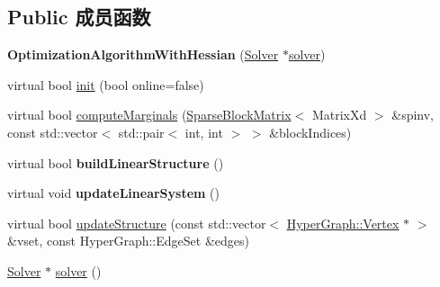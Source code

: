 \subsection*{Public 成员函数}
\begin{DoxyCompactItemize}
\item 
\hypertarget{classg2o_1_1OptimizationAlgorithmWithHessian_a1358f3500efe8b95a5af4a1b0edecdf0}{{\bfseries Optimization\-Algorithm\-With\-Hessian} (\hyperlink{classg2o_1_1Solver}{Solver} $\ast$\hyperlink{classg2o_1_1OptimizationAlgorithmWithHessian_a85473a4073c76b1a52cf9cf175e31c45}{solver})}\label{classg2o_1_1OptimizationAlgorithmWithHessian_a1358f3500efe8b95a5af4a1b0edecdf0}

\item 
virtual bool \hyperlink{classg2o_1_1OptimizationAlgorithmWithHessian_ae067a9c2961718dc8a37e3b8478b6d01}{init} (bool online=false)
\item 
virtual bool \hyperlink{classg2o_1_1OptimizationAlgorithmWithHessian_af1959727df2b7cf233a171cfed246e9a}{compute\-Marginals} (\hyperlink{classg2o_1_1SparseBlockMatrix}{Sparse\-Block\-Matrix}$<$ Matrix\-Xd $>$ \&spinv, const std\-::vector$<$ std\-::pair$<$ int, int $>$ $>$ \&block\-Indices)
\item 
\hypertarget{classg2o_1_1OptimizationAlgorithmWithHessian_aa84732c8554039ba0152693837bd1b4a}{virtual bool {\bfseries build\-Linear\-Structure} ()}\label{classg2o_1_1OptimizationAlgorithmWithHessian_aa84732c8554039ba0152693837bd1b4a}

\item 
\hypertarget{classg2o_1_1OptimizationAlgorithmWithHessian_a3ceacb3dddb14121b03e0afe7b7cfeaa}{virtual void {\bfseries update\-Linear\-System} ()}\label{classg2o_1_1OptimizationAlgorithmWithHessian_a3ceacb3dddb14121b03e0afe7b7cfeaa}

\item 
virtual bool \hyperlink{classg2o_1_1OptimizationAlgorithmWithHessian_a9ffffb2bdb70db856bccdb6774776fa3}{update\-Structure} (const std\-::vector$<$ \hyperlink{classg2o_1_1HyperGraph_1_1Vertex}{Hyper\-Graph\-::\-Vertex} $\ast$ $>$ \&vset, const Hyper\-Graph\-::\-Edge\-Set \&edges)
\item 
\hypertarget{classg2o_1_1OptimizationAlgorithmWithHessian_a85473a4073c76b1a52cf9cf175e31c45}{\hyperlink{classg2o_1_1Solver}{Solver} $\ast$ \hyperlink{classg2o_1_1OptimizationAlgorithmWithHessian_a85473a4073c76b1a52cf9cf175e31c45}{solver} ()}\label{classg2o_1_1OptimizationAlgorithmWithHessian_a85473a4073c76b1a52cf9cf175e31c45}


\end{DoxyCompactItemize}
